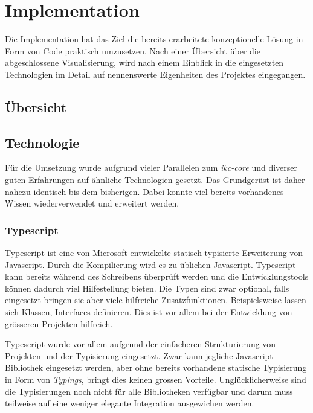 \chapter{Implementation}

Die Implementation hat das Ziel die bereits erarbeitete konzeptionelle Lösung in Form von Code praktisch umzusetzen. Nach einer Übersicht über die abgeschlossene Visualisierung, wird nach einem Einblick in die eingesetzten Technologien im Detail auf nennenswerte Eigenheiten des Projektes eingegangen.

\section{Übersicht}


\section{Technologie} \label{sec:technologie}

Für die Umsetzung wurde aufgrund vieler Parallelen zum \textit{ikc-core} und diverser guten Erfahrungen auf ähnliche Technologien gesetzt. Das Grundgerüst ist daher nahezu identisch bis dem bisherigen. Dabei konnte viel bereits vorhandenes Wissen wiederverwendet und erweitert werden.

\subsection{Typescript}

Typescript ist eine von Microsoft entwickelte statisch typisierte Erweiterung von Javascript. Durch die Kompilierung wird es zu üblichen Javascript. Typescript kann bereits während des Schreibens überprüft werden und die Entwicklungstools können dadurch viel Hilfestellung bieten. Die Typen sind zwar optional, falls eingesetzt bringen sie aber viele hilfreiche Zusatzfunktionen. Beispielsweise lassen sich Klassen, Interfaces definieren. Dies ist vor allem bei der Entwicklung von grösseren Projekten hilfreich.

\cite{typescriptlang}

Typescript wurde vor allem aufgrund der ein\-fach\-er\-en Struk\-tu\-rie\-rung von Projekten und der Typisierung eingesetzt. Zwar kann jegliche Ja\-va\-scri\-pt-Bibliothek eingesetzt werden, aber ohne bereits vorhandene statische Typisierung in Form von \textit{Typings}, bringt dies keinen grossen Vorteile. Unglücklicherweise sind die Typisierungen noch nicht für alle Bibliotheken verfügbar und darum muss teilweise auf eine weniger elegante Integration ausgewichen werden.

